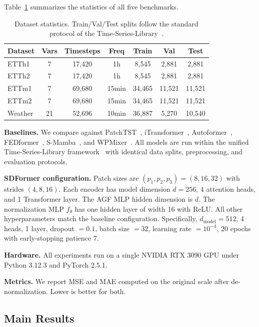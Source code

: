 \documentclass[journal]{IEEEtran}
\begin{document}
Table~\ref{tab:datasets} summarizes the statistics of all five benchmarks.

\begin{table}[!t]
\caption{Dataset statistics. Train/Val/Test splits follow the standard
  protocol of the Time-Series-Library~\cite{tsl}.}
\label{tab:datasets}
\centering
\renewcommand{\arraystretch}{1.15}
\setlength{\tabcolsep}{4pt}
\begin{tabular}{lcccccc}
\toprule
\textbf{Dataset} & \textbf{Vars} & \textbf{Timesteps} & \textbf{Freq} & \textbf{Train} & \textbf{Val} & \textbf{Test} \\
\midrule
ETTh1  & 7  & 17,420 & 1h   & 8,545  & 2,881 & 2,881 \\
ETTh2  & 7  & 17,420 & 1h   & 8,545  & 2,881 & 2,881 \\
ETTm1  & 7  & 69,680 & 15min & 34,465 & 11,521 & 11,521 \\
ETTm2  & 7  & 69,680 & 15min & 34,465 & 11,521 & 11,521 \\
Weather & 21 & 52,696 & 10min & 36,887 & 5,270 & 10,540 \\
\bottomrule
\end{tabular}
\end{table}

\textbf{Baselines.}
We compare against PatchTST~\cite{patchtst}, iTransformer~\cite{itransformer},
Autoformer~\cite{autoformer}, FEDformer~\cite{fedformer},
S-Mamba~\cite{smamba}, and WPMixer~\cite{xpatch}.
All models are run within the unified Time-Series-Library
framework~\cite{tsl} with identical data splits, preprocessing, and
evaluation protocols.

\textbf{SDFormer configuration.}
Patch sizes are $(p_1, p_2, p_3) = (8, 16, 32)$ with strides $(4, 8, 16)$.
Each encoder has model dimension $d = 256$, 4 attention heads, and 1
Transformer layer.
The AGF MLP hidden dimension is $d$.
The normalization MLP $f_\theta$ has one hidden layer of width 16 with ReLU.
All other hyperparameters match the baseline configuration.
Specifically, $d_\text{model} = 512$, 4 heads, 1 layer, dropout $= 0.1$, batch size
$= 32$, learning rate $= 10^{-4}$, 20 epochs with early-stopping patience 7.

\textbf{Hardware.}
All experiments run on a single NVIDIA RTX 3090 GPU under Python 3.12.3 and
PyTorch 2.5.1.

\textbf{Metrics.}
We report MSE and MAE computed on the original scale after de-normalization.
Lower is better for both.

\subsection{Main Results}
\end{document}
